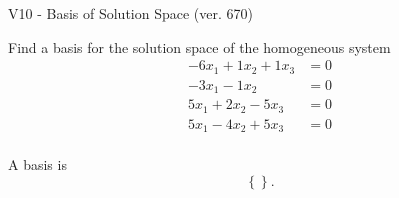 \begin{exercise}
  \begin{exerciseTitle}V10 - Basis of Solution Space (ver. 670)\end{exerciseTitle}
  \begin{exerciseStatement}
    Find a basis for the solution space of the homogeneous system 
\begin{align*}
 -6 x_ 1 + 1 x_ 2 + 1 x_ 3 &= 0  \\ 
  -3 x_ 1 -1 x_ 2 &= 0  \\ 
  5 x_ 1 + 2 x_ 2 -5 x_ 3 &= 0  \\ 
  5 x_ 1 -4 x_ 2 + 5 x_ 3 &= 0  \\ 
 \end{align*}


 
  \end{exerciseStatement}

  \begin{exerciseAnswer}
   A basis is   
\[\left\{\right\}.\]

  


  \end{exerciseAnswer}
\end{exercise}
